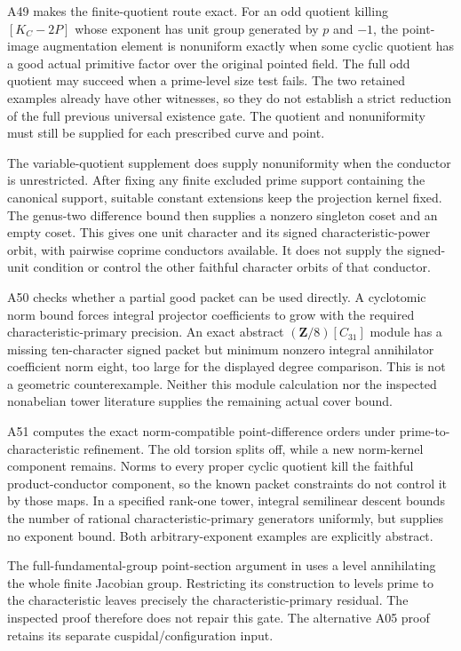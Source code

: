 \documentclass[11pt,a4paper]{article}
\begin{document}
A49 makes the finite-quotient route exact. For an odd quotient killing
$[K_C-2P]$ whose exponent has unit group generated by $p$ and $-1$,
the point-image augmentation element is nonuniform exactly when some
cyclic quotient has a good actual primitive factor over the original
pointed field. The full odd quotient may succeed when a prime-level
size test fails. The two retained examples already have other witnesses,
so they do not establish a strict reduction of the full previous
universal existence gate. The quotient and nonuniformity must still
be supplied for each prescribed curve and point.

The variable-quotient supplement does supply nonuniformity when the
conductor is unrestricted. After fixing any finite excluded prime support
containing the canonical support, suitable constant extensions keep the
projection kernel fixed. The genus-two difference bound then supplies a
nonzero singleton coset and an empty coset. This gives one unit character
and its signed characteristic-power orbit, with pairwise coprime
conductors available. It does not supply the signed-unit condition or
control the other faithful character orbits of that conductor.

A50 checks whether a partial good packet can be used directly. A
cyclotomic norm bound forces integral projector coefficients to grow with
the required characteristic-primary precision. An exact abstract
$(\mathbf Z/8)[C_{31}]$ module has a missing ten-character signed packet
but minimum nonzero integral annihilator coefficient norm eight, too
large for the displayed degree comparison. This is not a geometric
counterexample. Neither this module calculation nor the inspected
nonabelian tower literature supplies the remaining actual cover bound.

A51 computes the exact norm-compatible point-difference orders under
prime-to-charac\-teristic refinement. The old torsion splits off, while a
new norm-kernel component remains. Norms to every proper cyclic quotient
kill the faithful product-conductor component, so the known packet
constraints do not control it by those maps. In a specified rank-one
tower, integral semilinear descent bounds the number of rational
characteristic-primary generators uniformly, but supplies no exponent
bound. Both arbitrary-exponent examples are explicitly abstract.

The full-fundamental-group point-section argument in
\cite[\S3, Theorem~3, pp.~134--135]{Faltings840} uses a level annihilating
the whole finite Jacobian group. Restricting its construction to levels
prime to the characteristic leaves precisely the characteristic-primary
residual. The inspected proof therefore does not repair this gate.
The alternative A05 proof retains its separate cuspidal/configuration
input.
\end{document}
